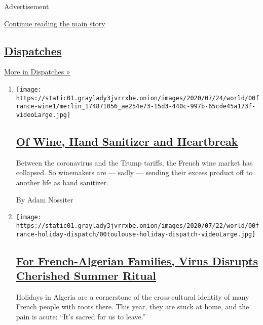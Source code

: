Advertisement

\protect\hyperlink{after-mid2}{Continue reading the main story}

\hypertarget{dispatches}{%
\subsection{\texorpdfstring{\href{/spotlight/dispatches-international}{Dispatches}}{Dispatches}}\label{dispatches}}

\href{/spotlight/dispatches-international}{More in Dispatches »}

\begin{enumerate}
\def\labelenumi{\arabic{enumi}.}
\item
  \texttt{[image: https://static01.graylady3jvrrxbe.onion/images/2020/07/24/world/00france-wine1/merlin\_174871056\_ae254e73-15d3-440c-997b-65cde45a173f-videoLarge.jpg]}

  \hypertarget{of-wine-hand-sanitizer-and-heartbreak}{%
  \subsection{\texorpdfstring{\href{/2020/07/27/world/europe/france-alsace-wine-coronavirus.html}{Of
  Wine, Hand Sanitizer and
  Heartbreak}}{Of Wine, Hand Sanitizer and Heartbreak}}\label{of-wine-hand-sanitizer-and-heartbreak}}

  Between the coronavirus and the Trump tariffs, the French wine market
  has collapsed. So winemakers are --- sadly --- sending their excess
  product off to another life as hand sanitizer.

  By Adam Nossiter
\item
  \texttt{[image: https://static01.graylady3jvrrxbe.onion/images/2020/07/22/world/00france-holiday-dispatch/00toulouse-holiday-dispatch-videoLarge.jpg]}

  \hypertarget{for-french-algerian-families-virus-disrupts-cherished-summer-ritual}{%
  \subsection{\texorpdfstring{\href{/2020/07/26/world/europe/france-algeria-summer-vacations.html}{For
  French-Algerian Families, Virus Disrupts Cherished Summer
  Ritual}}{For French-Algerian Families, Virus Disrupts Cherished Summer Ritual}}\label{for-french-algerian-families-virus-disrupts-cherished-summer-ritual}}

  Holidays in Algeria are a cornerstone of the cross-cultural identity
  of many French people with roots there. This year, they are stuck at
  home, and the pain is acute: ``It's sacred for us to leave.''


\end{enumerate}
